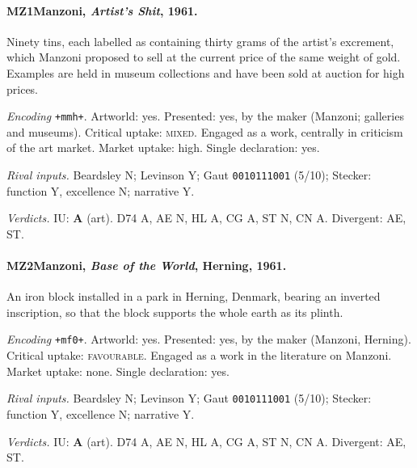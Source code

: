 \paragraph{MZ1\enspace Manzoni, \emph{Artist's Shit}, 1961.}
Ninety tins, each labelled as containing thirty grams of the artist's excrement, which Manzoni proposed to sell at the current price of the same weight of gold. Examples are held in museum collections and have been sold at auction for high prices.\par
\noindent\textit{Encoding} \texttt{+mmh+}. Artworld: yes. Presented: yes, by the maker (Manzoni; galleries and museums). Critical uptake: \textsc{mixed}. Engaged as a work, centrally in criticism of the art market. Market uptake: high. Single declaration: yes.\par
\noindent\textit{Rival inputs.} Beardsley N; Levinson Y; Gaut \texttt{0010111001} (5/10); Stecker: function Y, excellence N; narrative Y.\par
\noindent\textit{Verdicts.} IU: \textbf{A} (art). D74 A, AE N, HL A, CG A, ST N, CN A. Divergent: AE, ST.\par

\paragraph{MZ2\enspace Manzoni, \emph{Base of the World}, Herning, 1961.}
An iron block installed in a park in Herning, Denmark, bearing an inverted inscription, so that the block supports the whole earth as its plinth.\par
\noindent\textit{Encoding} \texttt{+mf0+}. Artworld: yes. Presented: yes, by the maker (Manzoni, Herning). Critical uptake: \textsc{favourable}. Engaged as a work in the literature on Manzoni. Market uptake: none. Single declaration: yes.\par
\noindent\textit{Rival inputs.} Beardsley N; Levinson Y; Gaut \texttt{0010111001} (5/10); Stecker: function Y, excellence N; narrative Y.\par
\noindent\textit{Verdicts.} IU: \textbf{A} (art). D74 A, AE N, HL A, CG A, ST N, CN A. Divergent: AE, ST.\par


